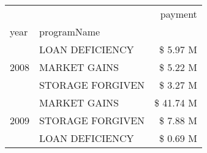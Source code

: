 \begin{tabular}{llr}
\toprule
 &  & payment \\
year & programName &  \\
\midrule
\multirow[t]{3}{*}{2008} & LOAN DEFICIENCY & \$ 5.97 M \\
 & MARKET GAINS & \$ 5.22 M \\
 & STORAGE FORGIVEN & \$ 3.27 M \\
\cline{1-3}
\multirow[t]{3}{*}{2009} & MARKET GAINS & \$ 41.74 M \\
 & STORAGE FORGIVEN & \$ 7.88 M \\
 & LOAN DEFICIENCY & \$ 0.69 M \\
\cline{1-3}
\bottomrule
\end{tabular}
